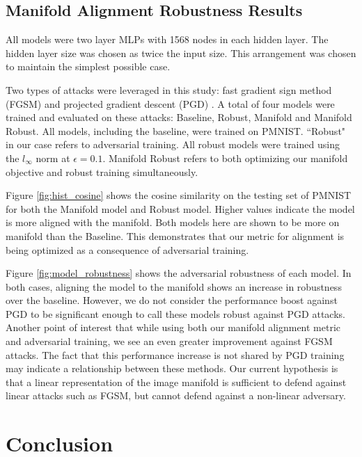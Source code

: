 \subsection{Manifold Alignment Robustness Results}

All models were two layer MLPs with 1568 nodes in each hidden layer.
The hidden layer size was chosen as twice the input size.
This arrangement was chosen to maintain the simplest possible case.

Two types of attacks were leveraged in this study: fast gradient sign method (FGSM) \citep{goodfellow_explaining_2014} and projected gradient descent (PGD) \citep{madry_towards_2017}.
A total of four models were trained and evaluated on these attacks: Baseline, Robust, Manifold and Manifold Robust.
All models, including the baseline, were trained on PMNIST.
``Robust" in our case refers to adversarial training.
All robust models were trained using the $l_\infty$ norm at $\epsilon = 0.1$.
Manifold Robust refers to both optimizing our manifold objective and robust training simultaneously.

Figure \ref{fig:hist_cosine} shows the cosine similarity on the testing set of PMNIST for both the Manifold model and Robust model.
Higher values indicate the model is more aligned with the manifold.
Both models here are shown to be more on manifold than the Baseline.
This demonstrates that our metric for alignment is being optimized as a consequence of adversarial training.

Figure \ref{fig:model_robustness} shows the adversarial robustness of each model.
In both cases, aligning the model to the manifold shows an increase in robustness over the baseline.
However, we do not consider the performance boost against PGD to be significant enough to call these models robust against PGD attacks.
Another point of interest that while using both our manifold alignment metric and adversarial training, we see an even greater improvement against FGSM attacks.
The fact that this performance increase is not shared by PGD training may indicate a relationship between these methods.
Our current hypothesis is that a linear representation of the image manifold is sufficient to defend against linear attacks such as FGSM, but cannot defend against a non-linear adversary.


\section{Conclusion}

